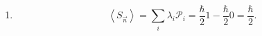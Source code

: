 \documentclass[11pt, letterpaper]{article}
\begin{document}
\begin{enumerate}
\begin{enumerate}
\begin{enumerate}
\begin{align*}
												 &=\frac{\hbar }{2} \left(\cos \theta \cos ^2\frac{\theta }{2} +\sin \theta \cos \frac{\theta }{2} \sin \frac{\theta }{2} +\cos \frac{\theta }{2} \sin \frac{\theta }{2} \sin \theta -\sin ^2\frac{\theta }{2} \cos \theta\right) \\
												 &=\frac{\hbar }{2} \left(\cos \theta \left( \cos ^2\frac{\theta }{2} -\sin ^2\frac{\theta }{2}  \right) +2 \sin \theta \cos \frac{\theta }{2} \sin \frac{\theta }{2}\right) \\
												 &=\frac{\hbar }{2} \left(\cos ^2\theta +\sin ^2\theta\right) \\
												 &=\frac{\hbar }{2} 
						.\end{align*}
					\item
						\[
							\left\langle S_{\vec{n} }  \right\rangle =\sum_{i} \lambda_i \mathcal{P}_{i} =\frac{\hbar }{2} 1-\frac{\hbar }{2} 0=\frac{\hbar }{2} 
						.\]
				\end{enumerate}
		\end{enumerate}
\end{enumerate}
\end{document}
